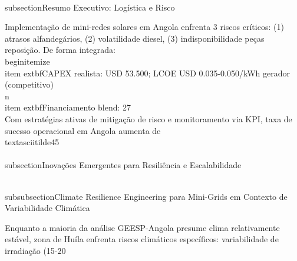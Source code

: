 \documentclass[12pt, a4paper]{article}
\begin{document}
{{{{{{{{{{{\\subsection{Resumo Executivo: Logística e Risco}

Implementação de mini-redes solares em Angola enfrenta 3 riscos críticos: (1) atrasos alfandegários, (2) volatilidade diesel, (3) indisponibilidade peças reposição. De forma integrada:\n\\begin{itemize}
\\item 	extbf{CAPEX realista}: USD 53.500; LCOE USD 0.035-0.050/kWh gerador (competitivo)\\n\n\\item 	extbf{Financiamento blend}: 27\\%

Com estratégias ativas de mitigação de risco e monitoramento via KPI, taxa de sucesso operacional em Angola aumenta de \\textasciitilde45\\%

\\subsection{Inovações Emergentes para Resiliência e Escalabilidade}

\\subsubsection{Climate Resilience Engineering para Mini-Grids em Contexto de Variabilidade Climática}

Enquanto a maioria da análise GEESP-Angola presume clima relativamente estável, zona de Huíla enfrenta riscos climáticos específicos: variabilidade de irradiação (15-20\\%

}}}}}}}}}}}
\end{document}
